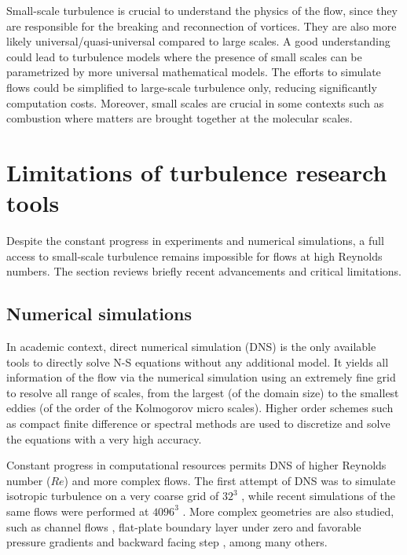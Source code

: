Small-scale turbulence is crucial to understand the physics of the flow, since they are responsible for the breaking and reconnection of vortices. They are also more likely universal/quasi-universal compared to large scales. A good understanding could lead to turbulence models where the presence of small scales can be parametrized by more universal mathematical models. The efforts to simulate flows could be simplified to large-scale turbulence only, reducing significantly computation costs.  Moreover, small scales are crucial in some contexts such as combustion where matters are brought together at the molecular scales.

\section{Limitations of turbulence research tools}
Despite the constant progress in experiments and numerical simulations, a full access to small-scale turbulence remains impossible for flows at high Reynolds numbers. The section reviews briefly recent advancements and critical limitations. 

\subsection{Numerical simulations}
In academic context, direct numerical simulation (DNS) is the only available tools to directly solve N-S equations without any additional model. It yields all information of the flow via the numerical simulation using an extremely fine grid to resolve all range of scales, from the largest (of the domain size) to the smallest eddies (of the order of the Kolmogorov micro scales). Higher order schemes such as compact finite difference or spectral methods are used to discretize and solve the equations with a very high accuracy.

Constant progress in computational resources permits DNS of higher Reynolds number ($ Re $) and more complex flows. The first attempt of DNS was to simulate isotropic turbulence on a very coarse grid of $ 32^3 $ \citep{fox1972numerical,orszag1972numerical}, while recent simulations of the same flows were performed at $ 4096^3 $ \citep{ishihara2009study,kaneda2003energy}. More complex geometries are also studied, such as channel flows \citep{sillero2013one,lee2014direct}, flat-plate boundary layer under zero and favorable pressure gradients \citep{spalart1986numerical,spalart1988direct} and backward facing step \citep{le1997direct}, among many others.

